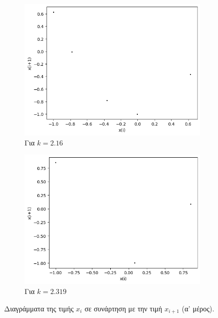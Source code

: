 \begin{figure}[ht]
\begin{subfigure}[b]{0.4\textwidth}
		\includegraphics[width=\textwidth]{LateX images/cheb q=0.9/g6}
		\caption{Για $k=2.16$}
		\label{f:k144}
	\end{subfigure}
	\hfill
	\begin{subfigure}[b]{0.4\textwidth}
		\centering
		\includegraphics[width=\textwidth]{LateX images/cheb q=0.9/g7}
		\caption{Για $k=2.319$}
		\label{f:k145}
	\end{subfigure}
	\hfill
	
	\caption{Διαγράμματα της τιμής \(x_i\) σε συνάρτηση με την τιμή \(x_{i+1}\) (α' μέρος).}
	\label{f:k250}
\end{figure}
